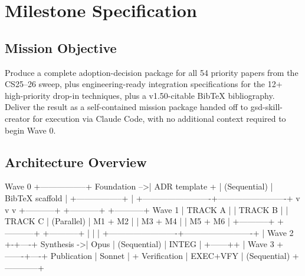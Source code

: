 \documentclass[11pt,letterpaper]{article}
\newcommand{\stageheader}[2]{%
  \noindent\colorbox{#2}{\makebox[\textwidth][l]{%
    \textcolor{white}{\bfseries\sffamily\hspace{6pt}#1\hspace{6pt}}}}%
  \vspace{0.5em}\par%
}
\begin{document}
\newpage

\stageheader{STAGE 3 --- MISSION PACKAGE}{tertiary}

\section{Milestone Specification}

\subsection{Mission Objective}

Produce a complete adoption-decision package for all 54 priority papers from the CS25--26 sweep, plus engineering-ready integration specifications for the 12+ high-priority drop-in techniques, plus a v1.50-citable BibTeX bibliography. Deliver the result as a self-contained mission package handed off to gsd-skill-creator for execution via Claude Code, with no additional context required to begin Wave 0.

\subsection{Architecture Overview}

\begin{asciibox}
                        Wave 0  +-----------------+
                  Foundation -->| ADR template +  |
                  (Sequential)  | BibTeX scaffold |
                                +-----------------+
                                        |
              +-------------------------+-------------------------+
              v                         v                         v
        +-----------+             +-----------+             +-----------+
Wave 1  | TRACK A   |             | TRACK B   |             | TRACK C   |
(Parallel)  |  M1 + M2  |          |  M3 + M4  |          |  M5 + M6  |
        +-----------+             +-----------+             +-----------+
              |                         |                         |
              +-------------------------+-------------------------+
                                        |
                              Wave 2  +-+----+
                          Synthesis ->| Opus  |
                       (Sequential)   | INTEG |
                                      +------++
                                              |
                              Wave 3  +-------+----+
                          Publication |  Sonnet    |
                       + Verification |  EXEC+VFY  |
                       (Sequential)   +------------+
\end{asciibox}
\end{document}
